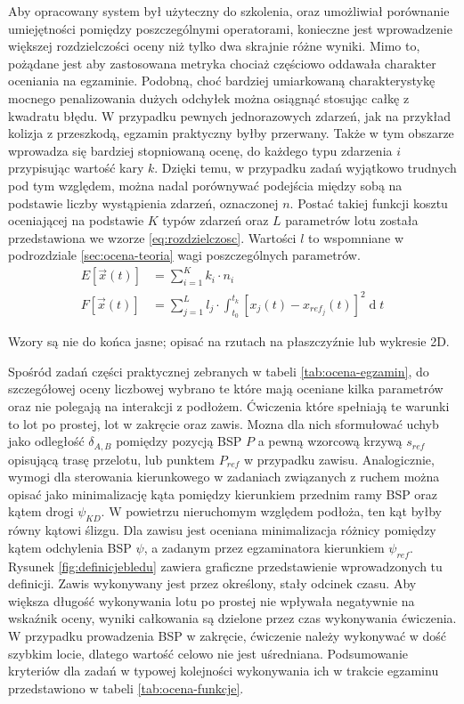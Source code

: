 Aby opracowany system był użyteczny do szkolenia, oraz umożliwiał porównanie umiejętności pomiędzy poszczególnymi operatorami, konieczne jest wprowadzenie większej rozdzielczości oceny niż tylko dwa skrajnie różne wyniki. Mimo to, pożądane jest aby zastosowana metryka chociaż częściowo oddawała charakter oceniania na egzaminie. Podobną, choć bardziej umiarkowaną charakterystykę mocnego penalizowania dużych odchyłek można osiągnąć stosując całkę z kwadratu błędu. W przypadku pewnych jednorazowych zdarzeń, jak na przykład kolizja z przeszkodą, egzamin praktyczny byłby przerwany. Także w tym obszarze wprowadza się bardziej stopniowaną ocenę, do każdego typu zdarzenia $ i $ przypisując wartość kary $ k $. Dzięki temu, w przypadku zadań wyjątkowo trudnych pod tym względem, można nadal porównywać podejścia między sobą na podstawie liczby wystąpienia zdarzeń, oznaczonej $ n $. Postać takiej funkcji kosztu oceniającej na podstawie $ K $ typów zdarzeń oraz $ L $ parametrów lotu została przedstawiona we wzorze \ref{eq:rozdzielczosc}. Wartości $ l $ to wspomniane w podrozdziale \ref{sec:ocena-teoria} wagi poszczególnych parametrów.
\begin{align}
    \label{eq:rozdzielczosc}
    E[ \vec{x}(t) ] &= \sum_{i=1}^{K} k_i \cdot n_i
    \\
    F[ \vec{x}(t) ] &= \sum_{j=1}^{L} l_j \cdot \int_{t_0}^{t_k} [ x_j(t) - x_{ref_j}(t) ]^2 \operatorname{d}t
\end{align}

\begin{todo}
    Wzory są nie do końca jasne; opisać na rzutach na płaszczyźnie lub wykresie 2D.
\end{todo}
Spośród zadań części praktycznej zebranych w tabeli \ref{tab:ocena-egzamin}, do szczegółowej oceny liczbowej wybrano te które mają oceniane kilka parametrów oraz nie polegają na interakcji z podłożem. Ćwiczenia które spełniają te warunki to lot po prostej, lot w zakręcie oraz zawis. Mozna dla nich sformułować uchyb jako odległość $ \delta_{A,B} $ pomiędzy pozycją BSP $ P $ a pewną wzorcową krzywą $ s_{ref} $ opisującą trasę przelotu, lub punktem $ P_{ref} $ w przypadku zawisu. Analogicznie, wymogi dla sterowania kierunkowego w zadaniach związanych z ruchem można opisać jako minimalizację kąta pomiędzy kierunkiem przednim ramy BSP oraz kątem drogi $ \psi_{KD} $. W powietrzu nieruchomym względem podłoża, ten kąt byłby równy kątowi ślizgu. Dla zawisu jest oceniana minimalizacja różnicy pomiędzy kątem odchylenia BSP $ \psi $, a zadanym przez egzaminatora kierunkiem $ \psi_{ref} $. Rysunek \ref{fig:definicjebledu} zawiera graficzne przedstawienie wprowadzonych tu definicji. Zawis wykonywany jest przez określony, stały odcinek czasu. Aby większa długość wykonywania lotu po prostej nie wpływała negatywnie na wskaźnik oceny, wyniki całkowania są dzielone przez czas wykonywania ćwiczenia. W przypadku prowadzenia BSP w zakręcie, ćwiczenie należy wykonywać w dość szybkim locie, dlatego wartość celowo nie jest uśredniana. Podsumowanie kryteriów dla zadań w typowej kolejności wykonywania ich w trakcie egzaminu przedstawiono w tabeli \ref{tab:ocena-funkcje}.

